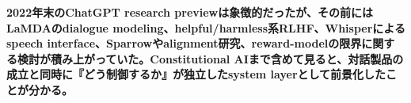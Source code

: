 \noindent\textbf{2022年末のChatGPT research previewは象徴的だったが、その前にはLaMDAのdialogue modeling、helpful/harmless系RLHF、Whisperによるspeech interface、Sparrowやalignment研究、reward-modelの限界に関する検討が積み上がっていた。Constitutional AIまで含めて見ると、対話製品の成立と同時に『どう制御するか』が独立したsystem layerとして前景化したことが分かる。}\autocite{src-2a9e3cfb3148,src-2b132b9f05ef,src-7ef567047bd7,src-bc1a61aec959,src-f4ecc26bd1e5}
